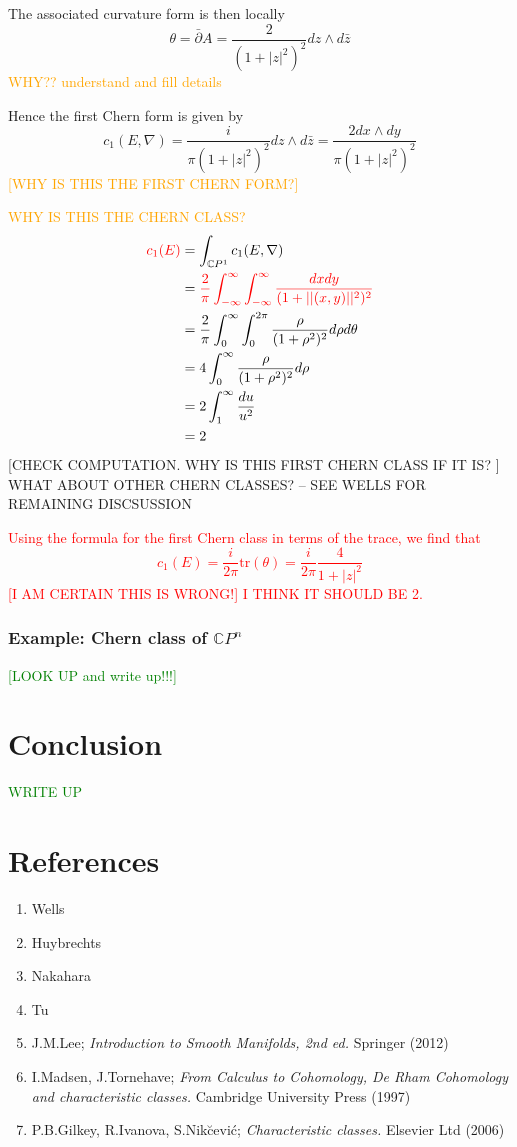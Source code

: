 \documentclass[a4paper]{article}
\theoremstyle{definition} \newtheorem*{definition}{Definition}
\theoremstyle{definition} \newtheorem*{definitions}{Definitions}
\theoremstyle{plain} \newtheorem{theorem}{Theorem}[section]
\theoremstyle{plain} \newtheorem{proposition}[theorem]{Proposition}
\theoremstyle{plain} \newtheorem{corollary}[theorem]{Corollary}
\theoremstyle{plain} \newtheorem{lemma}[theorem]{Lemma}
\theoremstyle{plain} \newtheorem{example}[theorem]{Example}
\newcommand{\checkCorrect}[1]{\textcolor{red}{#1}}
\newcommand{\understandBetter}[1]{\textcolor{orange}{#1}}
\newcommand{\finish}[1]{\textcolor{green}{#1}}
\newcommand{\complexnos}{\mathbb{C}}
\newcommand{\tr}{\text{tr}}
\begin{document}
The associated curvature form is then locally
$$\theta = \bar{\partial} A = \frac{2}{(1+|z|^2)^2} dz \wedge d\bar{z}$$
\understandBetter{WHY?? understand and fill details}

Hence the first Chern form is given by 
$$c_1(E, \nabla) = \frac{i}{\pi(1+|z|^2)^2} dz \wedge d\bar{z} = \frac{2dx\wedge dy}{\pi(1+|z|^2)^2}$$
\understandBetter{[WHY IS THIS THE FIRST CHERN FORM?]}

\understandBetter{WHY IS THIS THE CHERN CLASS?}
\begin{align*}
    \checkCorrect{c_1(E)} & =\int_{\complexnos P^1} c_1(E, \nabla) \\
    & = \checkCorrect{ \frac{2}{\pi} \int_{-\infty}^\infty \int_{-\infty}^\infty \frac{dx dy}{(1+||(x,y)||^2)^2}} \\
    & = \frac{2}{\pi} \int_{0}^\infty \int_{0}^{2\pi} \frac{\rho}{(1+\rho^2)^2} d\rho d\theta \\
    & = 4 \int_{0}^\infty \frac{\rho}{(1+\rho^2)^2} d\rho  \\
    & = 2 \int_{1}^\infty \frac{du}{u^2}  \\
    & = 2
\end{align*}
[CHECK COMPUTATION. WHY IS THIS FIRST CHERN CLASS IF IT IS? ]
WHAT ABOUT OTHER CHERN CLASSES? -- SEE WELLS FOR REMAINING DISCSUSSION

\checkCorrect{Using the formula for the first Chern class in terms of the trace, we find that
$$c_1(E) = \frac{i}{2\pi} \tr (\theta) = \frac{i}{2\pi} \frac{4}{1+|z|^2}$$
[I AM CERTAIN THIS IS WRONG!] I THINK IT SHOULD BE 2.}

\subsubsection{Example: Chern class of $\complexnos P^n$}
\finish{[LOOK UP and write up!!!]}

\section{Conclusion}
\finish{WRITE UP}

\section*{References}
\begin{enumerate}
\item Wells
\item Huybrechts
\item Nakahara
\item Tu
\item J.M.Lee; \textit{Introduction to Smooth Manifolds, 2nd ed.} Springer (2012)
\item I.Madsen, J.Tornehave; \textit{From Calculus to Cohomology, De Rham Cohomology and characteristic classes.} Cambridge University Press (1997)
\item P.B.Gilkey, R.Ivanova, S.Nik{\u c}evi\'c; \textit{Characteristic classes.} Elsevier Ltd (2006)
\end{enumerate}
\end{document}
